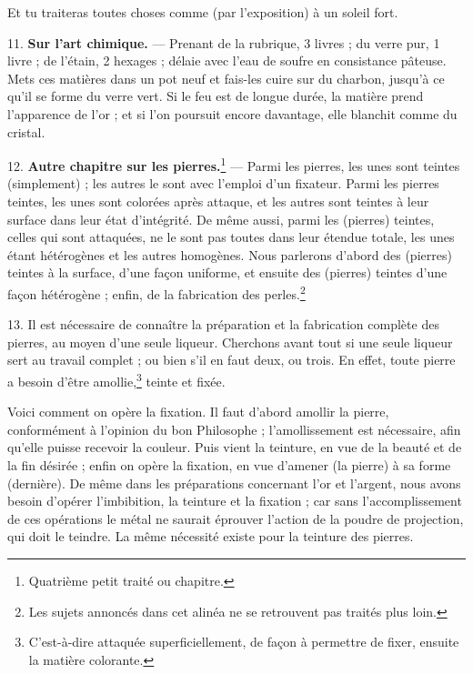 \documentclass[a4paper, 11pt, oneside, polutonikogreek, french]{article}
\begin{document}
Et tu traiteras toutes choses comme (par l'exposition) à un soleil fort.

11. \textbf{Sur l'art chimique.} --- Prenant de la rubrique, 3 livres ; du verre pur, 1 livre ; de l'étain, 2 hexages ; délaie avec l'eau de soufre en consistance pâteuse. Mets ces matières dans un pot neuf et fais-les cuire sur du charbon, jusqu'à ce qu'il se forme du verre vert. Si le feu est de longue durée, la matière prend l'apparence de l'or ; et si l'on poursuit encore davantage, elle blanchit comme du cristal.

12. \textbf{Autre chapitre sur les pierres.}\footnote{Quatrième petit traité ou chapitre.} --- Parmi les pierres, les unes sont teintes (simplement) ; les autres le sont avec l'emploi d'un fixateur. Parmi les pierres teintes, les unes sont colorées après attaque, et les autres sont teintes à leur surface dans leur état d'intégrité. De même aussi, parmi les (pierres) teintes, celles qui sont attaquées, ne le sont pas toutes dans leur étendue totale, les unes étant hétérogènes et les autres homogènes. Nous parlerons d'abord des (pierres) teintes à la surface, d'une façon uniforme, et ensuite des (pierres) teintes d'une façon hétérogène ; enfin, de la fabrication des perles.\footnote{Les sujets annoncés dans cet alinéa ne se retrouvent pas traités plus loin.}

13. Il est nécessaire de connaître la préparation et la fabrication complète des pierres, au moyen d'une seule liqueur. Cherchons avant tout si une seule liqueur sert au travail complet ; ou bien s'il en faut deux, ou trois. En effet, toute pierre a besoin d'être amollie,\footnote{C'est-à-dire attaquée superficiellement, de façon à permettre de fixer, ensuite la matière colorante.} teinte et fixée.

Voici comment on opère la fixation. Il faut d'abord amollir la pierre, conformément à l'opinion du bon Philosophe ; l'amollissement est nécessaire, afin qu'elle puisse recevoir la couleur. Puis vient la teinture, en vue de la beauté et de la fin désirée ; enfin on opère la fixation, en vue d'amener (la pierre) à sa forme (dernière). De même dans les préparations concernant l'or et l'argent, nous avons besoin d'opérer l'imbibition, la teinture et la fixation ; car sans l'accomplissement de ces opérations le métal ne saurait éprouver l'action de la poudre de projection, qui doit le teindre. La même nécessité existe pour la teinture des pierres.
\end{document}
